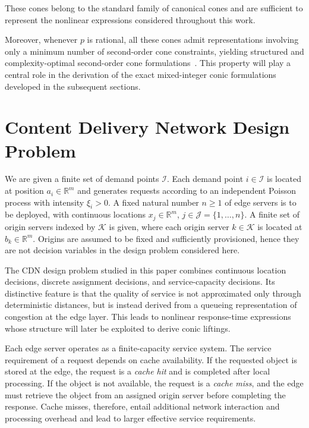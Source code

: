 \documentclass[a4paper,11pt,reqno]{amsart}
\newcommand{\R}{\mathbb{R}}
\newcommand{\K}{\mathcal{K}}
\newcommand{\I}{\mathcal{I}}
\newcommand{\J}{\mathcal{J}}
\begin{document}
These cones belong to the standard family of canonical cones and are sufficient to represent the nonlinear expressions considered throughout this work.

Moreover, whenever $p$ is rational, all these cones admit representations involving only a minimum number of second-order cone constraints, yielding structured and complexity-optimal second-order cone formulations~\citep{blanco2024minimal,blanco2025complexity}. This property will play a central role in the derivation of the exact mixed-integer conic formulations developed in the subsequent sections.

\section{Content Delivery Network Design Problem}\label{sec:prelims}

We are given a finite set of demand points $\I$. Each demand point $i\in\I$
is located at position $a_i\in\R^m$ and generates requests according to an independent
Poisson process with intensity $\xi_i>0$.
A fixed natural number $n\ge 1$ of edge servers is to be deployed, with continuous
locations $x_j\in\R^m$, $j\in\J = \{1, \ldots, n\}$.
A finite set of origin servers indexed by $\K$ is given, where each
origin server $k\in\K$ is located at $b_k\in\R^m$.
Origins are assumed to be fixed and sufficiently provisioned, hence they are not
decision variables in the design problem considered here.

The CDN design problem studied in this paper combines continuous location decisions,
discrete assignment decisions, and service-capacity decisions. Its distinctive feature is
that the quality of service is not approximated only through deterministic distances, but
is instead derived from a queueing representation of congestion at the edge layer. This
leads to nonlinear response-time expressions whose structure will later be exploited to
derive conic liftings.

Each edge server operates as a finite-capacity service system.
The service requirement of a request depends on cache availability.
If the requested object is stored at the edge, the request is a \emph{cache hit} and is
completed after local processing.
If the object is not available, the request is a \emph{cache miss}, and the edge must
retrieve the object from an assigned origin server before completing the
response.
Cache misses, therefore, entail additional network interaction and processing
overhead and lead to larger effective service requirements.
\end{document}
